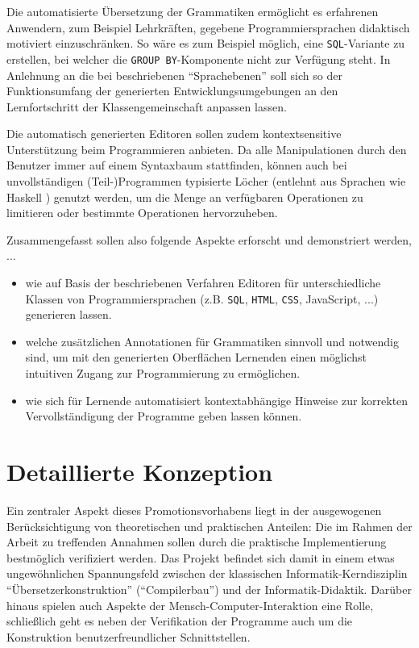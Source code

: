 \documentclass[paper=a4,fontsize=12pt,parskip=half]{scrartcl}
\begin{document}
Die automatisierte Übersetzung der Grammatiken ermöglicht es erfahrenen Anwendern, zum Beispiel Lehrkräften, gegebene Programmiersprachen didaktisch motiviert einzuschränken. So wäre es zum Beispiel möglich, eine \texttt{SQL}-Variante zu erstellen, bei welcher die \texttt{GROUP BY}-Komponente nicht zur Verfügung steht. In Anlehnung an die bei \cite{klaeren_macht_2007} beschriebenen \enquote{Sprachebenen} soll sich so der Funktionsumfang der generierten Entwicklungsumgebungen an den Lernfortschritt der Klassengemeinschaft anpassen lassen.

Die automatisch generierten Editoren sollen zudem kontextsensitive Unterstützung beim Programmieren anbieten. Da alle Manipulationen durch den Benutzer immer auf einem Syntaxbaum stattfinden, können auch bei unvollständigen (Teil-)Programmen typisierte Löcher (entlehnt aus Sprachen wie Haskell \cite{jones_haskell_2014}) genutzt werden, um die Menge an verfügbaren Operationen zu limitieren oder bestimmte Operationen hervorzuheben.

Zusammengefasst sollen also folgende Aspekte erforscht und demonstriert werden, ...

\begin{itemize}
\item wie auf Basis der beschriebenen Verfahren Editoren für unterschiedliche Klassen von Programmiersprachen (z.B. \texttt{SQL}, \texttt{HTML}, \texttt{CSS}, JavaScript, ...) generieren lassen.
\item welche zusätzlichen Annotationen für Grammatiken sinnvoll und notwendig sind, um mit den generierten Oberflächen Lernenden einen möglichst intuitiven Zugang zur Programmierung zu ermöglichen.
\item wie sich für Lernende automatisiert kontextabhängige Hinweise zur korrekten Vervollständigung der Programme geben lassen können.
\end{itemize}


\section{Detaillierte Konzeption}

Ein zentraler Aspekt dieses Promotionsvorhabens liegt in der ausgewogenen Berücksichtigung von theoretischen und praktischen Anteilen: Die im Rahmen der Arbeit zu treffenden Annahmen sollen durch die praktische Implementierung bestmöglich verifiziert werden. Das Projekt befindet sich damit in einem etwas ungewöhnlichen Spannungsfeld zwischen der klassischen Informatik-Kerndisziplin \enquote{Übersetzerkonstruktion} (\enquote{Compilerbau}) und der Informatik-Didaktik. Darüber hinaus spielen auch Aspekte der Mensch-Computer-Interaktion eine Rolle, schließlich geht es neben der Verifikation der Programme auch um die Konstruktion benutzerfreundlicher Schnittstellen.
\end{document}
